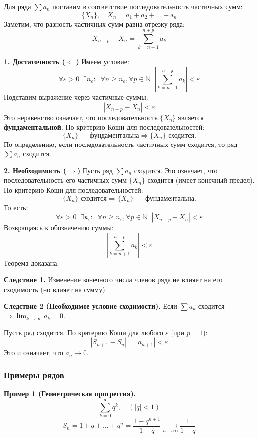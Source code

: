 \begin{tcolorbox}[title=Доказательство, breakable]
    Для ряда $\sum a_n$ поставим в соответствие последовательность частичных сумм:
    \[ \{X_n\}, \quad X_n = a_1 + a_2 + \dots + a_n \]
    Заметим, что разность частичных сумм равна отрезку ряда:
    \[ X_{n+p} - X_n = \sum_{k=n+1}^{n+p} a_k \]

    \textbf{1. Достаточность ($\Leftarrow$)}
    Имеем условие:
    \[ \forall \varepsilon > 0 \;\; \exists n_\varepsilon : \;\; \forall n \ge n_\varepsilon, \forall p \in \mathbb{N} \;\; \left| \sum_{k=n+1}^{n+p} a_k \right| < \varepsilon \]
    Подставим выражение через частичные суммы:
    \[ |X_{n+p} - X_n| < \varepsilon \]
    Это неравенство означает, что последовательность $\{X_n\}$ является \textbf{фундаментальной}.
    По критерию Коши для последовательностей:
    \[ \{X_n\} \text{ — фундаментальна} \Rightarrow \{X_n\} \text{ сходится}. \]
    По определению, если последовательность частичных сумм сходится, то ряд $\sum a_n$ сходится.

    \textbf{2. Необходимость ($\Rightarrow$)}
    Пусть ряд $\sum a_n$ сходится.
    Это означает, что последовательность его частичных сумм $\{X_n\}$ сходится (имеет конечный предел).
    По критерию Коши для последовательностей:
    \[ \{X_n\} \text{ сходится} \Rightarrow \{X_n\} \text{ — фундаментальна}. \]
    То есть:
    \[ \forall \varepsilon > 0 \;\; \exists n_\varepsilon : \;\; \forall n \ge n_\varepsilon, \forall p \in \mathbb{N} \;\; |X_{n+p} - X_n| < \varepsilon \]
    Возвращаясь к обозначению суммы:
    \[ \left| \sum_{k=n+1}^{n+p} a_k \right| < \varepsilon \]
    Теорема доказана.
\end{tcolorbox}

\textbf{Следствие 1.} Изменение конечного числа членов ряда не влияет на его сходимость (но влияет на сумму).

\textbf{Следствие 2 (Необходимое условие сходимости).}
Если $\sum a_k$ сходится $\Rightarrow \lim_{k\to\infty} a_k = 0$.
\begin{tcolorbox}[title=Доказательство]
    Пусть ряд сходится. По критерию Коши для любого $\varepsilon$ (при $p=1$):
    \[ |S_{n+1} - S_n| = |a_{n+1}| < \varepsilon \]
    Это и означает, что $a_n \to 0$.
\end{tcolorbox}

\subsubsection*{Примеры рядов}
\textbf{Пример 1 (Геометрическая прогрессия).}
\[ \sum_{k=0}^\infty q^k, \quad (|q| < 1) \]
\[ S_n = 1 + q + \dots + q^n = \frac{1-q^{n+1}}{1-q} \xrightarrow[n\to\infty]{} \frac{1}{1-q} \]

